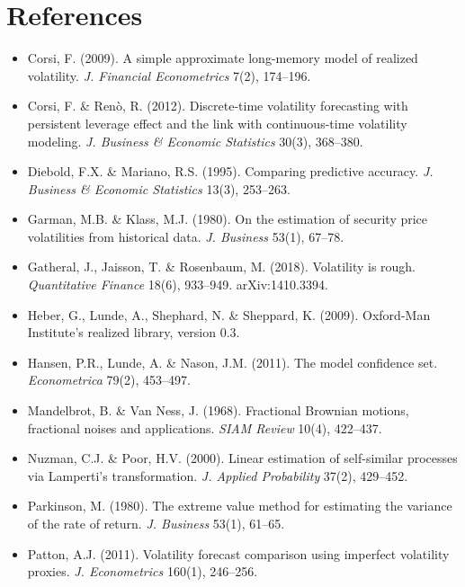 \documentclass[11pt,a4paper]{article}
\begin{document}
\section*{References}
\small
\begin{itemize}\itemsep0pt
\item[] Corsi, F. (2009). A simple approximate long-memory model of realized volatility. \emph{J. Financial Econometrics} 7(2), 174--196.
\item[] Corsi, F. \& Ren\`o, R. (2012). Discrete-time volatility forecasting with persistent leverage effect and the link with continuous-time volatility modeling. \emph{J. Business \& Economic Statistics} 30(3), 368--380.
\item[] Diebold, F.X. \& Mariano, R.S. (1995). Comparing predictive accuracy. \emph{J. Business \& Economic Statistics} 13(3), 253--263.
\item[] Garman, M.B. \& Klass, M.J. (1980). On the estimation of security price volatilities from historical data. \emph{J. Business} 53(1), 67--78.
\item[] Gatheral, J., Jaisson, T. \& Rosenbaum, M. (2018). Volatility is rough. \emph{Quantitative Finance} 18(6), 933--949. arXiv:1410.3394.
\item[] Heber, G., Lunde, A., Shephard, N. \& Sheppard, K. (2009). Oxford-Man Institute's realized library, version 0.3.
\item[] Hansen, P.R., Lunde, A. \& Nason, J.M. (2011). The model confidence set. \emph{Econometrica} 79(2), 453--497.
\item[] Mandelbrot, B. \& Van Ness, J. (1968). Fractional Brownian motions, fractional noises and applications. \emph{SIAM Review} 10(4), 422--437.
\item[] Nuzman, C.J. \& Poor, H.V. (2000). Linear estimation of self-similar processes via Lamperti's transformation. \emph{J. Applied Probability} 37(2), 429--452.
\item[] Parkinson, M. (1980). The extreme value method for estimating the variance of the rate of return. \emph{J. Business} 53(1), 61--65.
\item[] Patton, A.J. (2011). Volatility forecast comparison using imperfect volatility proxies. \emph{J. Econometrics} 160(1), 246--256.
\end{itemize}
\end{document}
